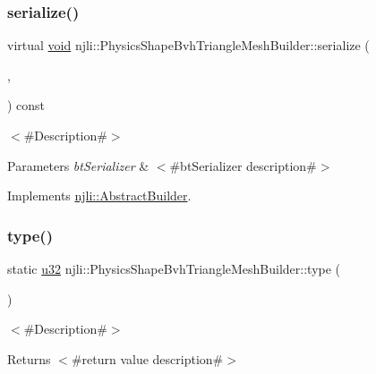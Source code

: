 \subsubsection{\texorpdfstring{serialize()}{serialize()}}
{\footnotesize\ttfamily virtual \mbox{\hyperlink{_thread_8h_af1e856da2e658414cb2456cb6f7ebc66}{void}} njli\+::\+Physics\+Shape\+Bvh\+Triangle\+Mesh\+Builder\+::serialize (\begin{DoxyParamCaption}\item[{\mbox{\hyperlink{_thread_8h_af1e856da2e658414cb2456cb6f7ebc66}{void}} $\ast$}]{,  }\item[{bt\+Serializer $\ast$}]{ }\end{DoxyParamCaption}) const\hspace{0.3cm}{\ttfamily [virtual]}}

$<$\#\+Description\#$>$


\begin{DoxyParams}{Parameters}
{\em bt\+Serializer} & $<$\#bt\+Serializer description\#$>$ \\
\hline
\end{DoxyParams}


Implements \mbox{\hyperlink{classnjli_1_1_abstract_builder_ab66b774e02ccb9da554c9aab7fa6d981}{njli\+::\+Abstract\+Builder}}.

\mbox{\label{classnjli_1_1_physics_shape_bvh_triangle_mesh_builder_a5dda474ef30e475f54b1fae2bb256a9d}} 
\subsubsection{\texorpdfstring{type()}{type()}}
{\footnotesize\ttfamily static \mbox{\hyperlink{_util_8h_a10e94b422ef0c20dcdec20d31a1f5049}{u32}} njli\+::\+Physics\+Shape\+Bvh\+Triangle\+Mesh\+Builder\+::type (\begin{DoxyParamCaption}{ }\end{DoxyParamCaption})\hspace{0.3cm}{\ttfamily [static]}}

$<$\#\+Description\#$>$

\begin{DoxyReturn}{Returns}
$<$\#return value description\#$>$ 
\end{DoxyReturn}


